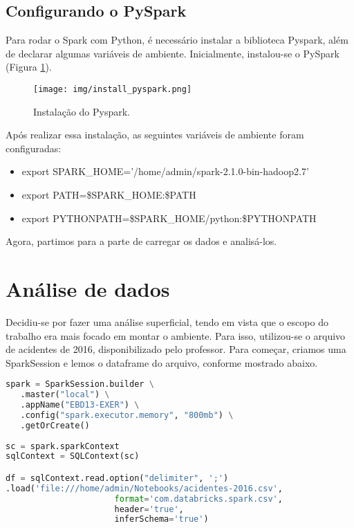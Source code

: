 \documentclass{article}
\begin{document}
\subsection{Configurando o PySpark}

Para rodar o Spark com Python, é necessário instalar a biblioteca Pyspark, além de declarar algumas variáveis de ambiente. Inicialmente, instalou-se o PySpark (Figura \ref{fig:pyspark_install}).

\begin{figure}[H]
  \texttt{[image: img/install\_pyspark.png]}
  \caption{Instalação do Pyspark.}
  \label{fig:pyspark_install}
\end{figure}

Após realizar essa instalação, as seguintes variáveis de ambiente foram configuradas:

\begin{itemize}
    \item export SPARK\_HOME='/home/admin/spark-2.1.0-bin-hadoop2.7'
    \item export PATH=\$SPARK\_HOME:\$PATH
    \item export PYTHONPATH=\$SPARK\_HOME/python:\$PYTHONPATH
\end{itemize}

Agora, partimos para a parte de carregar os dados e analisá-los.


\newpage
\section{Análise de dados}

Decidiu-se por fazer uma análise superficial, tendo em vista que o escopo do trabalho era mais focado em montar o ambiente. Para isso, utilizou-se o arquivo de acidentes de 2016, disponibilizado pelo professor. Para começar, criamos uma SparkSession e lemos o dataframe do arquivo, conforme mostrado abaixo.

\begin{lstlisting}[language=Python]
spark = SparkSession.builder \
   .master("local") \
   .appName("EBD13-EXER") \
   .config("spark.executor.memory", "800mb") \
   .getOrCreate()
   
sc = spark.sparkContext
sqlContext = SQLContext(sc)

df = sqlContext.read.option("delimiter", ';')
.load('file:///home/admin/Notebooks/acidentes-2016.csv', 
                      format='com.databricks.spark.csv', 
                      header='true', 
                      inferSchema='true')
\end{lstlisting}
\end{document}
